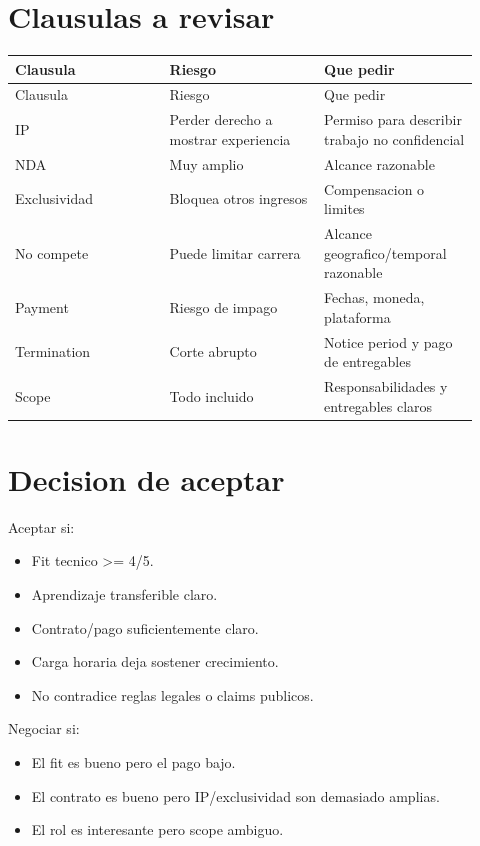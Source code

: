 \section{Clausulas a revisar}


\begin{center}
\scriptsize
\begin{longtable}{>{\raggedright\arraybackslash}p{0.305\linewidth} >{\raggedright\arraybackslash}p{0.305\linewidth} >{\raggedright\arraybackslash}p{0.305\linewidth}}
\toprule
Clausula & Riesgo & Que pedir \\
\midrule
\endfirsthead
\toprule
Clausula & Riesgo & Que pedir \\
\midrule
\endhead
IP & Perder derecho a mostrar experiencia & Permiso para describir trabajo no confidencial \\
NDA & Muy amplio & Alcance razonable \\
Exclusividad & Bloquea otros ingresos & Compensacion o limites \\
No compete & Puede limitar carrera & Alcance geografico/temporal razonable \\
Payment & Riesgo de impago & Fechas, moneda, plataforma \\
Termination & Corte abrupto & Notice period y pago de entregables \\
Scope & Todo incluido & Responsabilidades y entregables claros \\
\bottomrule
\end{longtable}
\end{center}



\section{Decision de aceptar}


Aceptar si:


\begin{itemize}
\item Fit tecnico >= 4/5.
\item Aprendizaje transferible claro.
\item Contrato/pago suficientemente claro.
\item Carga horaria deja sostener crecimiento.
\item No contradice reglas legales o claims publicos.
\end{itemize}


Negociar si:


\begin{itemize}
\item El fit es bueno pero el pago bajo.
\item El contrato es bueno pero IP/exclusividad son demasiado amplias.
\item El rol es interesante pero scope ambiguo.
\end{itemize}


